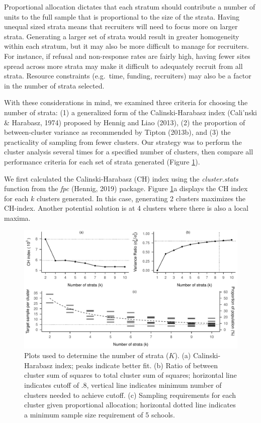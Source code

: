 \documentclass[
  english,
  man,floatsintext]{apa6}
\begin{document}
Proportional allocation dictates that each stratum should contribute a number of units to the full sample that is proportional to the size of the strata. Having unequal sized strata means that recruiters will need to focus more on larger strata. Generating a larger set of strata would result in greater homogeneity within each stratum, but it may also be more difficult to manage for recruiters. For instance, if refusal and non-response rates are fairly high, having fewer sites spread across more strata may make it difficult to adequately recruit from all strata. Resource constraints (e.g.~time, funding, recruiters) may also be a factor in the number of strata selected.

With these considerations in mind, we examined three criteria for choosing the number of strata: (1) a generalized form of the Calinski-Harabasz index (Cali\a'nski \& Harabasz, 1974) proposed by Hennig and Liao (2013), (2) the proportion of between-cluster variance as recommended by Tipton (2013b), and (3) the practicality of sampling from fewer clusters. Our strategy was to perform the cluster analysis several times for a specified number of clusters, then compare all performance criteria for each set of strata generated (Figure \ref{fig:fig-k-plots}).

We first calculated the Calinski-Harabasz (CH) index using the \emph{cluster.stats} function from the \emph{fpc} (Hennig, 2019) package. Figure \ref{fig:fig-k-plots}a displays the CH index for each \(k\) clusters generated. In this case, generating 2 clusters maximizes the CH-index. Another potential solution is at 4 clusters where there is also a local maxima.



\begin{figure}[tbp]
\includegraphics[width=1\linewidth]{6---Paper_files/figure-latex/fig-k-plots-1} \caption{Plots used to determine the number of strata (\(K\)). (a) Calinski-Harabasz index; peaks indicate better fit. (b) Ratio of between cluster sum of squares to total cluster sum of squares; horizontal line indicates cutoff of .8, vertical line indicates minimum number of clusters needed to achieve cutoff. (c) Sampling requirements for each cluster given proportional allocation; horizontal dotted line indicates a minimum sample size requirement of 5 schools. }\label{fig:fig-k-plots}
\end{figure}
\end{document}
